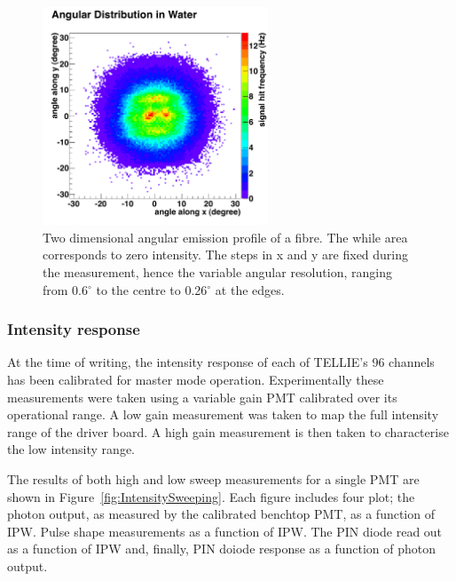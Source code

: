 \documentclass[12pt]{report}
\begin{document}
\begin{figure}[htbp]
	\begin{center}
		\includegraphics[width=0.6\textwidth]{AngularResponse}
		\caption{Two dimensional angular emission profile of a fibre. The while area corresponds to zero intensity. The steps in x and y are fixed during the measurement, hence the variable angular resolution, ranging from 0.6$^{\circ}$ to the centre to 0.26$^{\circ}$ at the edges.}
		\label{fig:AngularResponse}
	\end{center}
\end{figure}

\subsubsection{Intensity response}
At the time of writing, the intensity response of each of TELLIE's 96 channels has been calibrated for master mode operation. Experimentally these measurements were taken using a variable gain PMT calibrated over its operational range. A low gain measurement was taken to map the full intensity range of the driver board. A high gain measurement is then taken to characterise the low intensity range. 

The results of both high and low sweep measurements for a single PMT are shown in Figure~\ref{fig:IntensitySweeping}. Each figure includes four plot; the photon output, as measured by the calibrated benchtop PMT, as a function of IPW. Pulse shape measurements as a function of IPW. The PIN diode read out as a function of IPW and, finally, PIN doiode response as a function of photon output.
\end{document}
